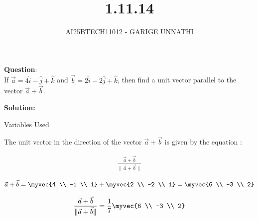 \documentclass[journal]{IEEEtran}
\begin{document}

\vspace{3cm}

\title{1.11.14}
\author{AI25BTECH11012 - GARIGE UNNATHI}
{\let\newpage\relax\maketitle}


\renewcommand{\thefigure}{\theenumi}
\renewcommand{\thetable}{\theenumi}
\setlength{\intextsep}{10pt} %


\renewcommand{\thetable}{\theenumi}


\textbf{Question}:\\
If $\vec{a} = 4\hat{i} - \hat{j} + \hat{k}$ and $\vec{b} = 2\hat{i} - 2\hat{j} + \hat{k}$, 
then find a unit vector parallel to the vector $\vec{a} + \vec{b}$.
 
\textbf{Solution: }

 \begin{table}[h!]    
      \centering
      
      \caption{Variables Used}
      \label{}
    \end{table}

The unit vector in the direction of the vector  $\vec{a} + \vec{b}$ is given by the equation :

 \begin{align*}
\frac{\vec{a}+\vec{b}}{\lVert \vec{a}+\vec{b} \rVert}
\end{align*}


\begin{align}
   \vec{a}+\vec{b} = \myvec{4 \\ -1 \\ 1} + \myvec{2 \\ -2 \\ 1} = \myvec{6 \\ -3 \\ 2}
\end{align}


\begin{align}
   \frac{\vec{a}+\vec{b}}{\lVert \vec{a}+\vec{b} \rVert} = \frac{1}{7} \myvec{6 \\ -3 \\ 2}
\end{align}
\end{document}
